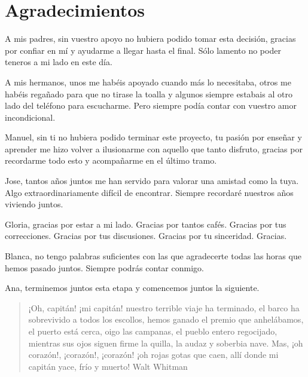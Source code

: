 \chapter{Agradecimientos}

A mis padres, sin vuestro apoyo no hubiera podido tomar esta decisión, gracias por confiar en mí y ayudarme a llegar hasta el final. Sólo lamento no poder teneros a mi lado en este día.


A mis hermanos, unos me habéis apoyado cuando más lo necesitaba, otros me habéis regañado para que no tirase la toalla y algunos siempre estabais al otro lado del teléfono para escucharme. Pero siempre podía contar con vuestro amor incondicional.


Manuel, sin ti no hubiera podido terminar este proyecto, tu pasión por enseñar y aprender me hizo volver a ilusionarme con aquello que tanto disfruto, gracias por recordarme todo esto y acompañarme en el último tramo.

Jose, tantos años juntos me han servido para valorar una amistad como la tuya. Algo extraordinariamente difícil de encontrar. Siempre recordaré nuestros años viviendo juntos.


Gloria, gracias por estar a mi lado. Gracias por tantos cafés. Gracias por tus correcciones. Gracias por tus discusiones. Gracias por tu sinceridad. Gracias.


Blanca, no tengo palabras suficientes con las que agradecerte todas las horas que hemos pasado juntos. Siempre podrás contar conmigo.


Ana, terminemos juntos esta etapa y comencemos juntos la siguiente.
\vspace{1cm}





\begin{verse}
\noindent
¡Oh, capitán! ¡mi capitán! nuestro terrible viaje ha terminado,\newline
el barco ha sobrevivido a todos los escollos,\newline
hemos ganado el premio que anhelábamos,\newline
el puerto está cerca, oigo las campanas, el pueblo entero regocijado,\newline
mientras sus ojos siguen firme la quilla, la audaz y soberbia nave.\newline
Mas, ¡oh corazón!, ¡corazón!, ¡corazón!\newline
¡oh rojas gotas que caen,\newline
allí donde mi capitán yace, frío y muerto!\newline\newline
Walt Whitman
\end{verse}


